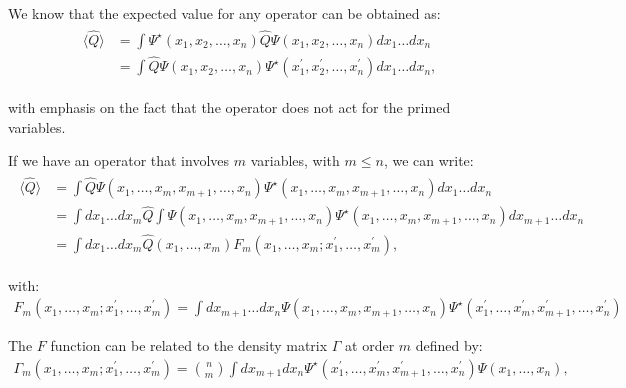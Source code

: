 We know that the expected value for any operator can be obtained as:
%
\begin{align}
	\begin{split}
    \langle \widehat{Q} \rangle & = \int\Psi^{\star}(x_{1},x_{2},\ldots,x_{n}) \widehat{Q}
    \Psi(x_{1},x_{2},\ldots,x_{n}) dx_{1}\ldots dx_{n} \\ 
	  & = \int\widehat{Q}\Psi(x_{1},x_{2},\ldots,x_{n}) \Psi^{\star}(x^{\prime}_{1},x^{\prime}_{2},\ldots,x^{\prime}_{n})
	  dx_{1}\ldots dx_{n} ,
	\end{split}
\end{align}

\noindent with emphasis on the fact that the operator does not act for the
primed variables.

If we have an operator that involves $m$ variables, with $m\le n$, we can
write:
%
\small
\begin{align}
	\begin{split}
\langle \widehat{Q} \rangle & = \int\widehat{Q}\Psi(x_{1},\ldots , x_{m}, x_{m+1}, \ldots , x_{n})
\Psi^{\star}(x_{1},\ldots , x_{m}, x_{m+1}, \ldots , x_{n}) dx_{1}\ldots dx_{n} \\
	& =\int dx_{1}\ldots dx_{m} \widehat{Q}\int\Psi(x_{1},\ldots , x_{m}, x_{m+1}, \ldots , x_{n})
	\Psi^{\star}(x_{1},\ldots , x_{m}, x_{m+1}, \ldots , x_{n}) dx_{m+1}\ldots dx_{n}\\
	& =\int dx_{1}\ldots dx_{m} \widehat{Q} (x_{1}, \ldots , x_{m}) F_{m}
	(x_{1}, \ldots , x_{m}; x^{\prime}_{1}, \ldots , x^{\prime}_{m}),
	\end{split}
\end{align}
\normalsize

\noindent with:
%
\footnotesize
\begin{align}
  F_{m}(x_{1}, \ldots , x_{m}; x^{\prime}_{1}, \ldots , x^{\prime}_{m}) =
  \int dx_{m+1}\ldots dx_{n} \Psi(x_{1},\ldots , x_{m}, x_{m+1}, \ldots , x_{n})
  \Psi^{\star}(x^{\prime}_{1},\ldots , x^{\prime}_{m}, x^{\prime}_{m+1}, \ldots , x^{\prime}_{n})
\end{align}
\normalsize

The $F$ function can be related to the density matrix
$\Gamma$ at order $m$ defined by:
%
\footnotesize
\begin{align}
  \Gamma_{m}(x_{1}, \ldots , x_{m}; x^{\prime}_{1}, \ldots , x^{\prime}_{m}) = {n \choose m}\int dx_{m+1}
  dx_{n} \Psi^{\star}(x^{\prime}_{1},\ldots , x^{\prime}_{m}, x^{\prime}_{m+1}, \ldots , x^{\prime}_{n}) \Psi(x_{1},\ldots ,x_{n}),
\end{align}
\normalsize

